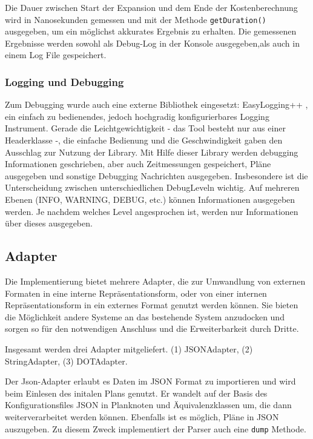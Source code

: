 Die Dauer zwischen Start der Expansion und dem Ende der Kostenberechnung wird in Nanosekunden gemessen und mit der Methode \texttt{getDuration()} ausgegeben, um ein möglichst akkurates Ergebnis zu erhalten. Die gemessenen Ergebnisse werden sowohl als Debug-Log in der Konsole ausgegeben,als auch  in einem Log File gespeichert.




\subsubsection{Logging und Debugging}
Zum Debugging wurde auch eine externe Bibliothek eingesetzt: EasyLogging++ \cite{easylogging}, ein einfach zu bedienendes, jedoch hochgradig konfigurierbares Logging Instrument. Gerade die Leichtgewichtigkeit - das Tool besteht nur aus einer Headerklasse -, die einfache Bedienung und die Geschwindigkeit gaben  den Ausschlag zur Nutzung der Library. Mit Hilfe dieser Library werden debugging Informationen geschrieben, aber auch Zeitmessungen gespeichert, Pläne ausgegeben und sonstige Debugging Nachrichten ausgegeben. Insbesondere ist die Unterscheidung zwischen unterschiedlichen Debug\-Leveln wichtig. Auf mehreren Ebenen (INFO, WARNING, DEBUG, etc.) können Informationen ausgegeben werden. Je nachdem welches Level angesprochen ist, werden nur Informationen über dieses ausgegeben. 


\subsection{Adapter}

Die Implementierung bietet mehrere Adapter, die zur Umwandlung von externen Formaten in eine interne Repräsentationsform, oder von einer internen Repräsentationsform in ein externes Format genutzt werden können. Sie bieten die Möglichkeit andere Systeme an das bestehende System anzudocken und sorgen so für den notwendigen Anschluss und die Erweiterbarkeit durch Dritte.

Insgesamt werden drei Adapter mitgeliefert. (1) JSON\-Adapter, (2) String\-Adapter, (3) DOT\-Adapter.

Der Json-Adapter erlaubt es Daten im JSON Format zu importieren und wird beim Einlesen des initalen Plans genutzt. Er wandelt auf der Basis des Konfigurationsfiles JSON in Planknoten und Äquivalenzklassen um, die dann weiterverarbeitet werden können. Ebenfalls ist es möglich, Pläne in JSON auszugeben. Zu diesem Zweck implementiert der Parser auch eine \texttt{dump} Methode.

